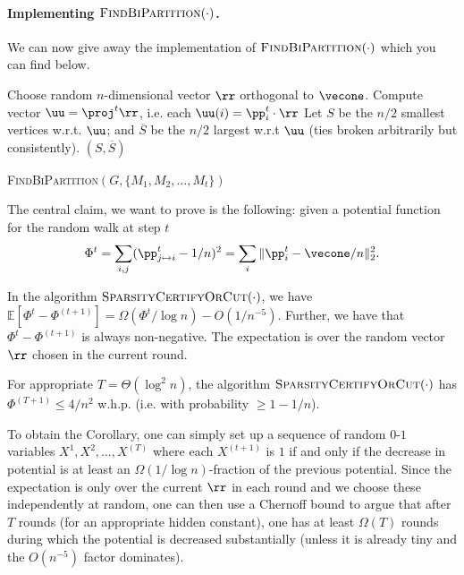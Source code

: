 \paragraph{Implementing $\textsc{FindBiPartition}(\cdot)$.} We can now give away the implementation of $\textsc{FindBiPartition}(\cdot)$ which you can find below.

\begin{algorithm}[H]
    Choose random $n$-dimensional vector $\rr$ orthogonal to $\vecone$.\;
    Compute vector $\uu = \proj^t \rr$, i.e. each $\uu(i) = \pp_i^t \cdot \rr$\;
    Let $S$ be the $n/2$ smallest vertices w.r.t. $\uu$; and $\overline{S}$ be the $n/2$ largest w.r.t $\uu$ (ties broken arbitrarily but consistently).\;
    \Return $(S, \overline{S})$
  \caption{\textsc{FindBiPartition}$(G, \{M_1, M_2, \dots, M_t\})$}
  \label{algo:findBiPartition}
\end{algorithm}

The central claim, we want to prove is the following: given a potential function for the random walk at step $t$
\[
    \Phi^t = \sum_{i,j} (\pp_{j \mapsto i}^t - 1/n)^2 = \sum_{i} \|\pp_{i}^t - \vecone/n\|_2^2.
\]
\begin{claim}\label{clm:mainClaimCutMatching}
In the algorithm $\textsc{SparsityCertifyOrCut}(\cdot)$, we have $\mathbb{E}[\Phi^{t} - \Phi^{(t+1)}] = \Omega(\Phi^t / \log n) - O(1/n^{-5})$. Further, we have that $\Phi^{t} - \Phi^{(t+1)}$ is always non-negative. The expectation is over the random vector $\rr$ chosen in the current round.
\end{claim}

\begin{corollary}\label{cor:fewRoundsCutMathcing}
For appropriate $T = \Theta(\log^2 n)$, the algorithm $\textsc{SparsityCertifyOrCut}(\cdot)$ has $\Phi^{(T+1)} \leq 4/n^2$ w.h.p. (i.e. with probability $\geq 1-1/n$).
\end{corollary}

To obtain the Corollary, one can simply set up a sequence of random $0$-$1$ variables $X^1, X^2, \ldots, X^{(T)}$ where each $X^{(t+1)}$ is $1$ if and only if the decrease in potential is at least an $\Omega(1/\log n)$-fraction of the previous potential. Since the expectation is only over the current $\rr$ in each round and we choose these independently at random, one can then use a Chernoff bound to argue that after $T$ rounds (for an appropriate hidden constant), one has at least $\Omega(T)$ rounds during which the potential is decreased substantially (unless it is already tiny and the $O(n^{-5})$ factor dominates). 

